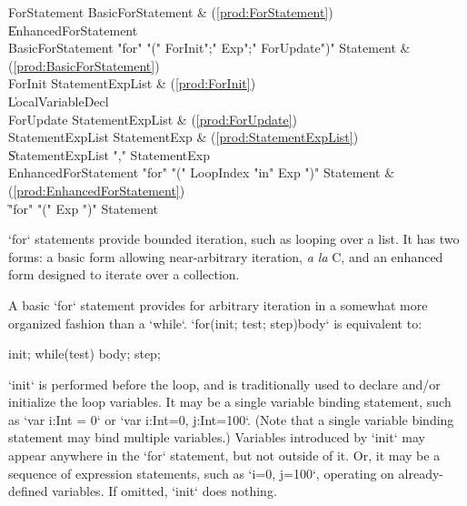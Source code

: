 \begin{bbgrammar}
 ForStatement    \: BasicForStatement & (\ref{prod:ForStatement})\\%
    \| EnhancedForStatement\\
 BasicForStatement    \: \xcd"for" \xcd"(" ForInit\opt \xcd";" Exp\opt \xcd";" ForUpdate\opt \xcd")" Statement & (\ref{prod:BasicForStatement})\\%
 ForInit    \: StatementExpList & (\ref{prod:ForInit})\\%
    \| LocalVariableDecl\\
 ForUpdate    \: StatementExpList & (\ref{prod:ForUpdate})\\%
 StatementExpList    \: StatementExp & (\ref{prod:StatementExpList})\\%
    \| StatementExpList \xcd"," StatementExp\\
 EnhancedForStatement    \: \xcd"for" \xcd"(" LoopIndex \xcd"in" Exp \xcd")" Statement & (\ref{prod:EnhancedForStatement})\\%
    \| \xcd"for" \xcd"(" Exp \xcd")" Statement\\
\end{bbgrammar}


\xcd`for` statements provide bounded iteration, such as looping over a list.
It has two forms: a basic form allowing near-arbitrary iteration, {\em a la}
C, and an enhanced form designed to iterate over a collection.

A basic \xcd`for` statement provides for arbitrary iteration in a somewhat
more organized fashion than a \xcd`while`.  \xcd`for(init; test; step)body` is
equivalent to: 
\begin{xten}
{
   init;
   while(test) {
      body;
      step;
   }
}
\end{xten}

\xcd`init` is performed before the loop, and is traditionally used to declare
and/or initialize the loop variables. It may be a single variable binding
statement, such as \xcd`var i:Int = 0` or \xcd`var i:Int=0, j:Int=100`. (Note
that a single variable binding statement may bind multiple variables.)
Variables introduced by \xcd`init` may appear anywhere in the \xcd`for`
statement, but not outside of it.  Or, it may be a sequence of expression
statements, such as \xcd`i=0, j=100`, operating on already-defined variables.
If omitted, \xcd`init` does nothing.

